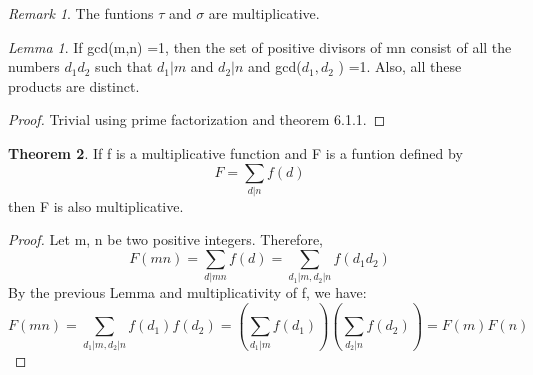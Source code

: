 \documentclass[15,a4paper]{report}
\theoremstyle{definition}
\newtheorem{theorem}{Theorem}[section]
\theoremstyle{remark}
\newtheorem*{remark}{Remark}
\newtheorem{lemma}[theorem]{Lemma}
\begin{document}
        \begin{remark}
             The funtions $\tau$ and $\sigma$ are multiplicative.
        \end{remark}
        \begin{lemma}
            If gcd(m,n) =1, then the set of positive divisors of mn consist of all the numbers $d_1 d_2$ such that $d_1|m$ and $d_2|n$ and gcd($d_1 , d_2$ ) =1. Also, all these products are distinct. 
        \end{lemma}
            \begin{proof}
                Trivial using prime factorization and theorem 6.1.1.
            \end{proof}
        \begin{theorem}
            If f is a multiplicative function and F is a funtion defined by \[ F = \sum_{d|n} f(d) \] then F is also multiplicative.
        \end{theorem}    
            \begin{proof}
                Let m, n be two positive integers. Therefore, \[ F(mn) = \sum_{d|mn} f(d) = \sum_{d_1|m , d_2|n} f(d_1 d_2) \]
                By the previous Lemma and multiplicativity of f, we have:
                \[ F(mn) = \sum_{d_1|m , d_2|n } f(d_1)f(d_2) = (\sum_{d_1|m} f(d_1))(\sum_{d_2|n} f(d_2)) = F(m)F(n) \]
            \end{proof}
\end{document}
